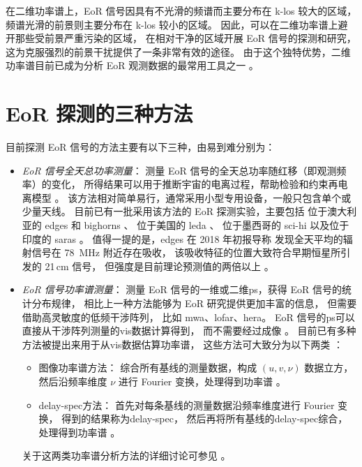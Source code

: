 在二维功率谱上，EoR 信号因具有不光滑的频谱而主要分布在 \ac{k-los} 较大的区域，
频谱光滑的前景则主要分布在 \ac{k-los} 较小的区域。
因此，可以在二维功率谱上避开那些受前景严重污染的区域，
在相对干净的区域开展 EoR 信号的探测和研究，
这为克服强烈的前景干扰提供了一条非常有效的途径。
由于这个独特优势，二维功率谱目前已成为分析 EoR 观测数据的最常用工具之一
\cite{trott2012,thyagarajan2013,barry2016,beardsley2016,trott2016,patil2017}。


\section{EoR 探测的三种方法}
\label{sec:det-methods}

目前探测 EoR 信号的方法主要有以下三种，由易到难分别为：
\begin{itemize}
\item \emph{EoR 信号全天总功率测量}：
测量 EoR 信号的全天总功率随红移（即观测频率）的变化，
所得结果可以用于推断宇宙的电离过程，帮助检验和约束再电离模型
\cite{pritchard2012,liu2016}。
该方法相对简单易行，通常采用小型专用设备，一般只包含单个或少量天线。
目前已有一批采用该方法的 EoR 探测实验，主要包括
位于澳大利亚的 \ac{edges} \cite{bowman2008} 和
\ac{bighorns} \cite{sokolowski2015}、
位于美国的 \ac{leda} \cite{greenhill2012}、
位于墨西哥的 \ac{sci-hi} \cite{voytek2014}
以及位于印度的 \ac{saras} \cite{singh2018}。
值得一提的是，\acs{edges} 在 2018 年初报导称
发现全天平均的辐射信号在 \SI{78}{\MHz} 附近存在吸收，
该吸收特征的位置大致符合早期恒星所引发的 21\,cm 信号，
但强度是目前理论预测值的两倍以上 \cite{bowman2018}。

\item \emph{EoR 信号功率谱测量}：
测量 EoR 信号的一维或二维\ac{ps}，获得 EoR 信号的统计分布规律，
相比上一种方法能够为 EoR 研究提供更加丰富的信息，
但需要借助高灵敏度的低频干涉阵列，
比如 \ac{mwa}、\ac{lofar}、\ac{hera}。
EoR 信号的\ac{ps}可以直接从干涉阵列测量的\ac{vis}数据计算得到，
而不需要经过成像 。
目前已有多种方法被提出来用于从\ac{vis}数据估算功率谱，
这些方法可大致分为以下两类 \cite{morales2019}：
\begin{itemize}
  \item 图像功率谱方法：
    综合所有基线的测量数据，构成 $(u,v,\nu)$ 数据立方，
    然后沿频率维度 $\nu$ 进行 Fourier 变换，处理得到功率谱
    \cite{dillon2015,trott2016,beardsley2017,barry2019}。
  \item \ac{delay-spec}方法：
    首先对每条基线的测量数据沿频率维度进行 Fourier 变换，
    得到的结果称为\ac{delay-spec}，
    然后再将所有基线的\ac{delay-spec}综合，处理得到功率谱
    \cite{parsons2012,vedantham2012,ali2015}。
\end{itemize}
关于这两类功率谱分析方法的详细讨论可参见 。


\end{itemize}
